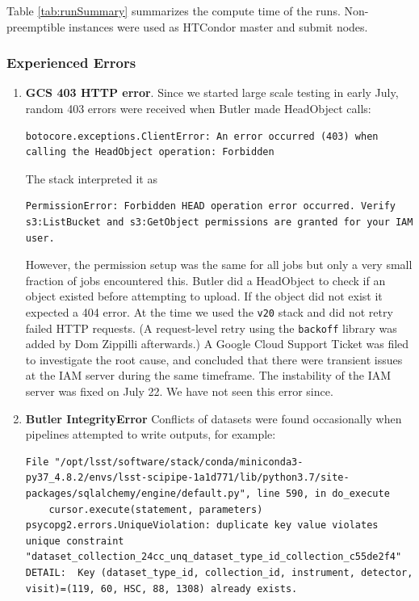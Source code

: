 Table \ref{tab:runSummary} summarizes the compute time of the runs.
Non-preemptible instances were used as HTCondor master and submit nodes.



\subsubsection{Experienced Errors}
\begin{enumerate}
\item \textbf{GCS 403 HTTP error}.
Since we started large scale testing in early July, random 403 errors were received when Butler made HeadObject calls:
\begin{lstlisting}[style=basherror]
botocore.exceptions.ClientError: An error occurred (403) when calling the HeadObject operation: Forbidden
\end{lstlisting}
The stack interpreted it as
\begin{lstlisting}[style=basherror]
PermissionError: Forbidden HEAD operation error occurred. Verify s3:ListBucket and s3:GetObject permissions are granted for your IAM user.
\end{lstlisting}
However, the permission setup was the same for all jobs but only a very small fraction of jobs encountered this.
Butler did a HeadObject to check if an object existed before attempting to upload.
If the object did not exist it expected a 404 error.
At the time we used the \texttt{v20} stack and did not retry failed HTTP requests.
(A request-level retry using the \texttt{backoff} library was added by Dom Zippilli afterwards.)
A Google Cloud Support Ticket was filed to investigate the root cause, and concluded that there were transient issues at the IAM server during the same timeframe.
The instability of the IAM server was fixed on July 22.
We have not seen this error since.


\item  \textbf{Butler IntegrityError}
Conflicts of datasets were found occasionally when pipelines attempted to write outputs, for example:
\begin{lstlisting}[style=basherror]
  File "/opt/lsst/software/stack/conda/miniconda3-py37_4.8.2/envs/lsst-scipipe-1a1d771/lib/python3.7/site-packages/sqlalchemy/engine/default.py", line 590, in do_execute
    cursor.execute(statement, parameters)
psycopg2.errors.UniqueViolation: duplicate key value violates unique constraint "dataset_collection_24cc_unq_dataset_type_id_collection_c55de2f4"
DETAIL:  Key (dataset_type_id, collection_id, instrument, detector, visit)=(119, 60, HSC, 88, 1308) already exists.


\end{lstlisting}
\end{enumerate}
